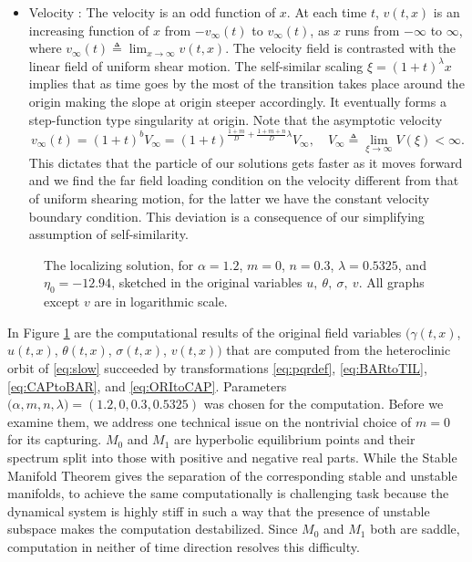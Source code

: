 \documentclass[a4paper,11pt]{article}
\def\red{\color{red}}
\theoremstyle{remark}
\begin{document}
\begin{itemize}
\item Velocity : The velocity is an odd function of $x$. At each time $t$, $v(t,x)$ is an increasing function of $x$ from $-v_\infty(t)$ to $v_\infty(t)$, as $x$ runs from $-\infty$ to $\infty$, where $v_\infty(t)\triangleq \lim_{x \rightarrow \infty} v(t,x)$. The velocity field is contrasted with the linear field of uniform shear motion. The self-similar scaling  $\xi=(1+t)^\lambda x$ implies that as time goes by the most of the transition takes place around the origin making the slope at origin steeper accordingly. It eventually forms a step-function type singularity at origin. Note that the asymptotic velocity $$v_\infty(t)=(1+t)^{b}V_\infty = (1+t)^{\frac{1+m}{D} + \frac{1+m+n}{D}\lambda}V_\infty, \quad V_\infty \triangleq \lim_{\xi \rightarrow \infty} V(\xi) <\infty.$$
This dictates that the particle of our solutions gets faster as it moves forward and we find the far field loading condition on the velocity different from that of uniform shearing motion, for the latter we have the constant velocity boundary condition. This deviation is a consequence of our simplifying assumption of self-similarity.
\end{itemize}

\begin{figure}[ht]
 \centering
\caption{The localizing solution, for $\alpha=1.2$, $m=0$, $n=0.3$, $\lambda =0.5325$, and $\eta_0=-12.94$, sketched in the original variables $u, \ \theta, \ \sigma, \ v$.
All graphs except $v$ are in logarithmic scale.} \label{fig:computation}
\end{figure}

In Figure \ref{fig:computation} are the computational results of the original field variables $\big(\gamma(t,x)$, $u(t,x)$, $\theta(t,x)$, $\sigma(t,x)$, $v(t,x)\big)$ that are computed from the heteroclinic orbit of \eqref{eq:slow} succeeded by transformations \eqref{eq:pqrdef}, \eqref{eq:BARtoTIL}, \eqref{eq:CAPtoBAR}, and \eqref{eq:ORItoCAP}. Parameters $\big(\alpha,m,n,\lambda)=(1.2,0,0.3,0.5325)$ was chosen for the computation. Before we examine them, we address one technical issue on the nontrivial choice of $m=0$ for its capturing. $M_0$ and $M_1$ are hyperbolic equilibrium points and their spectrum split into those with positive and negative real parts. While the Stable Manifold Theorem gives the separation of the corresponding stable and unstable manifolds, to achieve the same computationally is challenging task because the dynamical system is highly stiff in such a way that the presence of unstable subspace makes the computation destabilized. Since $M_0$ and $M_1$ both are saddle, computation in neither of time direction resolves this difficulty. 
\end{document}
